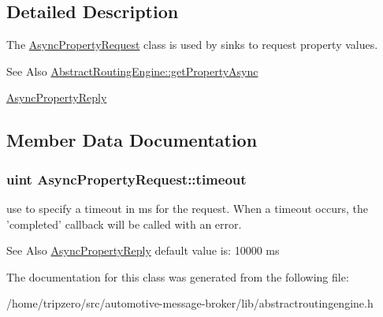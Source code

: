 \subsection{Detailed Description}
The \hyperlink{classAsyncPropertyRequest}{Async\-Property\-Request} class is used by sinks to request property values. 

\begin{DoxySeeAlso}{See Also}
\hyperlink{classAbstractRoutingEngine_ad1cbda415f674be4a3ce49be05aa8ee8}{Abstract\-Routing\-Engine\-::get\-Property\-Async} 

\hyperlink{classAsyncPropertyReply}{Async\-Property\-Reply} 
\end{DoxySeeAlso}


\subsection{Member Data Documentation}
\hypertarget{classAsyncPropertyRequest_a449da60204ce7c13462be179f869105c}{
\subsubsection[{timeout}]{\setlength{\rightskip}{0pt plus 5cm}uint Async\-Property\-Request\-::timeout}}\label{classAsyncPropertyRequest_a449da60204ce7c13462be179f869105c}


use to specify a timeout in ms for the request. When a timeout occurs, the 'completed' callback will be called with an error. 

\begin{DoxySeeAlso}{See Also}
\hyperlink{classAsyncPropertyReply}{Async\-Property\-Reply} default value is\-: 10000 ms 
\end{DoxySeeAlso}


The documentation for this class was generated from the following file\-:\begin{DoxyCompactItemize}
\item 
/home/tripzero/src/automotive-\/message-\/broker/lib/abstractroutingengine.\-h\end{DoxyCompactItemize}
